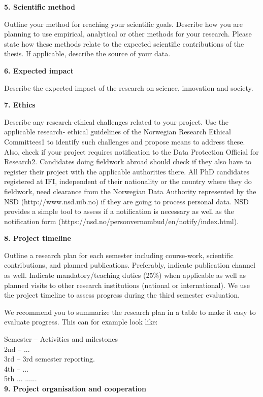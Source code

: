 \documentclass{article}
\begin{document}
\textbf{5. Scientific method}

Outline your method for reaching your scientific goals. Describe how you are planning to use empirical, analytical or other methods for your research. Please state how these methods relate to the expected scientific contributions of the thesis. If applicable, describe the source of your data.

\textbf{6. Expected impact}

Describe the expected impact of the research on science, innovation and society.

\textbf{7. Ethics}

Describe any research-ethical challenges related to your project. Use the applicable research- ethical guidelines of the Norwegian Research Ethical Committees1 to identify such challenges and propose means to address these. Also, check if your project requires notification to the Data Protection Official for Research2. Candidates doing fieldwork abroad should check if they also have to register their project with the applicable authorities there. All PhD candidates registered at IFI, independent of their nationality or the country where they do fieldwork, need clearance from the Norwegian Data Authority represented by the NSD (http://www.nsd.uib.no) if they are going to process personal data. NSD provides a simple tool to assess if a notification is necessary as well as the notification form (https://nsd.no/personvernombud/en/notify/index.html).

\textbf{8. Project timeline}

Outline a research plan for each semester including course-work, scientific contributions, and planned publications. Preferably, indicate publication channel as well. Indicate mandatory/teaching duties (25\%) when applicable as well as planned visits to other research institutions (national or international). We use the project timeline to assess progress during the third semester evaluation.


We recommend you to summarize the research plan in a table to make it easy to evaluate progress. This can for example look like:

Semester -- Activities and milestones\\
2nd -- ...\\
3rd -- 3rd semester reporting.\\
4th -- ...\\
5th ... ......\\

\textbf{9. Project organisation and cooperation}
\end{document}
